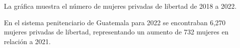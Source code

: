 La gráfica muestra el número de mujeres privadas de libertad de 2018 a 2022. 

En el sistema penitenciario de Guatemala para 2022 se encontraban 6,270 mujeres privadas de libertad, representando un aumento de 732 mujeres en relación a 2021. 